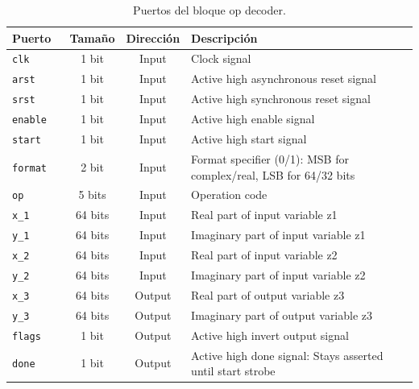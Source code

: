 \documentclass[10pt,a4paper]{book}
\begin{document}
      \begin{table}[h]
      \centering
      \begin{tabular}{lccl}
         \hline
         Puerto            &  Tama\~no    &  Direcci\'on    &  Descripci\'on                                                  \\ \hline \hline
         \verb|clk      |  &  1  bit      &  Input          &  Clock signal                                                   \\ \hline
         \verb|arst     |  &  1   bit      &  Input          &  Active high asynchronous reset signal                          \\ \hline
         \verb|srst     |  &  1  bit      &  Input          &  Active high synchronous reset signal                           \\ \hline
         \verb|enable   |  &  1  bit      &  Input          &  Active high enable signal                                      \\ \hline
         \verb|start    |  &  1  bit      &  Input          &  Active high start signal                                       \\ \hline
         \verb|format   |  &  2  bit      &  Input          &  Format specifier (0/1): MSB for complex/real, LSB for 64/32 bits\\ \hline
         \verb|op       |  &  5  bits     &  Input          &  Operation code                                                 \\ \hline
         \verb|x_1      |  &  64 bits     &  Input          &  Real      part of input variable z1                            \\ \hline
         \verb|y_1      |  &  64 bits     &  Input          &  Imaginary part of input variable z1                            \\ \hline
         \verb|x_2      |  &  64 bits     &  Input          &  Real      part of input variable z2                            \\ \hline
         \verb|y_2      |  &  64 bits     &  Input          &  Imaginary part of input variable z2                            \\ \hline
         \verb|x_3      |  &  64 bits     &  Output         &  Real      part of output variable z3                           \\ \hline
         \verb|y_3      |  &  64 bits     &  Output         &  Imaginary part of output variable z3                           \\ \hline
         \verb|flags    |  &  1  bit      &  Output         &  Active high invert output signal                               \\ \hline
         \verb|done     |  &  1  bit      &  Output         &  Active high done signal: Stays asserted until start strobe     \\ \hline
      \end{tabular}
      \caption{Puertos del bloque op decoder.}
      \label{tab:bkm_fixed_ports}
      \end{table}
\end{document}
